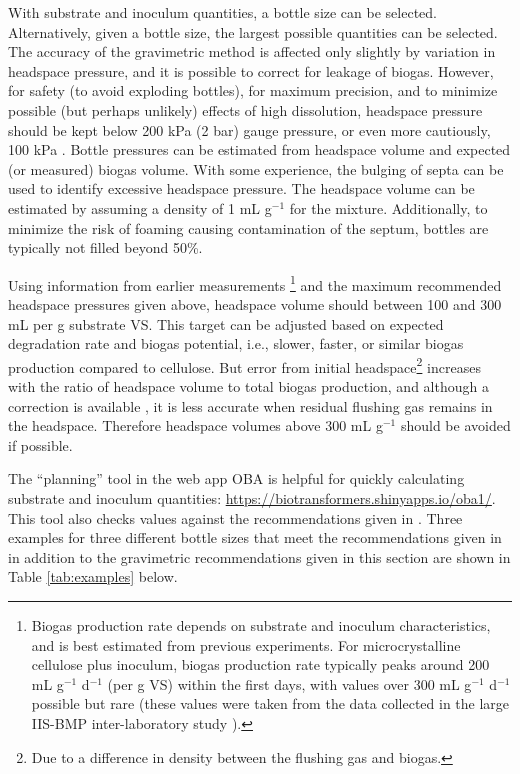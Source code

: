 \documentclass[]{article}
\begin{document}
With substrate and inoculum quantities, a bottle size can be selected.
Alternatively, given a bottle size, the largest possible quantities can be selected.
The accuracy of the gravimetric method is affected only slightly by variation in headspace pressure, and it is possible to correct for leakage of biogas. 
However, for safety (to avoid exploding bottles), for maximum precision, and to minimize possible (but perhaps unlikely) effects of high  dissolution, headspace pressure should be kept below 200 kPa (2 bar) gauge pressure, or even more cautiously, 100 kPa \citep{hafnerSystematicErrorManometric2019}. 
Bottle pressures can be estimated from headspace volume and expected (or measured) biogas volume.
With some experience, the bulging of septa can be used to identify excessive headspace pressure.
The headspace volume can be estimated by assuming a density of 1 mL g$^{-1}$ for the mixture.
Additionally, to minimize the risk of foaming causing contamination of the septum, bottles are typically not filled beyond 50\%.

Using information from earlier measurements
\footnote{
\label{fn:cellrate}
  Biogas production rate depends on substrate and inoculum characteristics, and is best estimated from previous experiments.
  For microcrystalline cellulose plus inoculum, biogas production rate typically peaks around 200 mL g$^{-1}$ d$^{-1}$ (per g VS) within the first days, with values over 300 mL g$^{-1}$ d$^{-1}$ possible but rare (these values were taken from the data collected in the large IIS-BMP inter-laboratory study \citep{hafnerImprovingInterlaboratoryReproducibility2020}).
} 
and the maximum recommended headspace pressures given above, headspace volume should between 100 and 300 mL per g substrate VS.
This target can be adjusted based on expected degradation rate and biogas potential, i.e., slower, faster, or similar biogas production compared to cellulose.
But error from initial headspace\footnote{Due to a difference in density between the flushing gas and biogas.} increases with the ratio of headspace volume to total biogas production, and although a correction is available \citep{justesenDevelopmentValidationLowcost2019}, it is less accurate when residual flushing gas remains in the headspace.
Therefore headspace volumes above 300 mL g$^{-1}$ should be avoided if possible.

The ``planning'' tool in the web app OBA is helpful for quickly calculating substrate and inoculum quantities: \url{https://biotransformers.shinyapps.io/oba1/}.
This tool also checks values against the recommendations given in \citet{holligerStandardizationBiomethanePotential2016}.
Three examples for three different bottle sizes that meet the recommendations given in \citet{holligerStandardizationBiomethanePotential2016} in addition to the gravimetric recommendations given in this section are shown in Table \ref{tab:examples} below.
\end{document}
